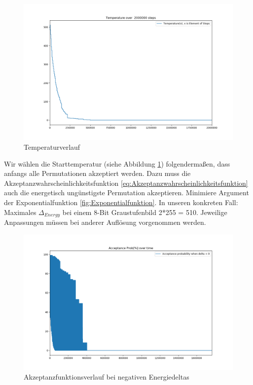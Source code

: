 \begin{figure}[H]
    \centering
    \includegraphics[width=\linewidth]{content/simulatedAnnealing/Bilder/Temperature.png}
    \caption{Temperaturverlauf}
    \label{pic:Temperaturverlauf kirkpatrick}
\end{figure}

Wir wählen die Starttemperatur (siehe Abbildung \ref{pic:Temperaturverlauf kirkpatrick}) folgendermaßen, dass 
anfangs alle Permutationen akzeptiert werden. Dazu muss die 
Akzeptanzwahrscheinlichkeitsfunktion \ref{eq:Akzeptanzwahrscheinlichkeitsfunktion} auch die energetisch
ungünstigste Permutation akzeptieren. Minimiere Argument der Exponentialfunktion \ref{fig:Exponentialfunktion}.
In unseren konkreten Fall: Maximales $\Delta_{Energy}$ bei einem 8-Bit Graustufenbild 2*255 = 510. Jeweilige 
Anpassungen müssen bei anderer Auflösung vorgenommen werden.

\begin{figure}[H]
    \centering
    \includegraphics[width=\linewidth]{content/simulatedAnnealing/Bilder/Acceptance_Probabilities_over_time_1765297_steps_KirkpatrickCooldownSchedule.png}
    \caption{Akzeptanzfunktionsverlauf bei negativen Energiedeltas}
    \label{pic:Akzeptanzfunktionsverlauf kirkpatrick}
\end{figure}

